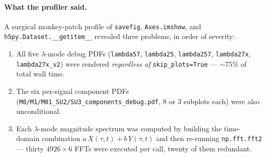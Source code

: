 \documentclass[11pt,letterpaper]{article}
\begin{document}
\paragraph{What the profiler said.}
A surgical monkey-patch profile of \texttt{savefig},
\texttt{Axes.imshow}, and \texttt{h5py.Dataset.\_\_getitem\_\_}
revealed three problems, in order of severity:
\begin{enumerate}[noitemsep,leftmargin=*]
  \item All five $\lambda$-mode debug PDFs
        (\texttt{lambda57}, \texttt{lambda25}, \texttt{lambda257},
        \texttt{lambda27x}, \texttt{lambda27x\_v2}) were rendered
        \emph{regardless of} \texttt{skip\_plots=True} ---
        $\sim 75\%$ of total wall time.
  \item The six per-signal component PDFs
        (\texttt{M0/M1/M01\_SU2/SU3\_components\_debug.pdf},
         8 or 3 subplots each) were also unconditional.
  \item Each $\lambda$-mode magnitude spectrum was computed by
        building the time-domain combination
        $a\,X(\tau,t)+b\,Y(\tau,t)$ and then re-running
        \texttt{np.fft.fft2} --- thirty $4926\times6$ FFTs were
        executed per call, twenty of them redundant.
\end{enumerate}
\end{document}
